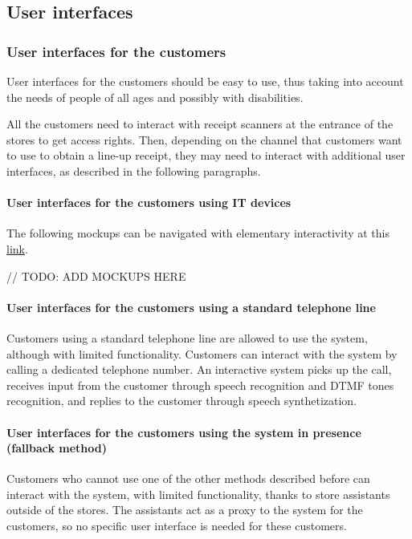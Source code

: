 \documentclass[../../main.tex]{subfiles}
\begin{document}
\subsection{User interfaces}

  \subsubsection{User interfaces for the customers}

  User interfaces for the customers should be easy to use, thus taking into
  account the needs of people of all ages and possibly with disabilities.

  All the customers need to interact with receipt scanners at the entrance of
  the stores to get access rights. Then, depending on
  the channel that customers want to use to obtain a line-up receipt, they may
  need to interact with additional user interfaces, as described in the
  following paragraphs.

  \paragraph{User interfaces for the customers using IT devices}

  The following mockups can be navigated with elementary interactivity at this \href{https://app.moqups.com/GnQbxBHNrI/view/page/ad64222d5?ui=0}{link}.

  // TODO: ADD MOCKUPS HERE

  \paragraph{User interfaces for the customers using a standard telephone line}

  Customers using a standard telephone line are allowed to use the system,
  although with limited functionality. Customers can interact with the system by
  calling a dedicated telephone number. An interactive system picks up the call,
  receives input from the customer through speech recognition and DTMF tones
  recognition, and replies to the customer through speech synthetization.

  \paragraph{User interfaces for the customers using the system in presence (fallback method)}

  Customers who cannot use one of the other methods described before can
  interact with the system, with limited functionality, thanks to store
  assistants outside of the stores. The assistants act as a proxy to the system
  for the customers, so no specific user interface is needed for these
  customers.
\end{document}
